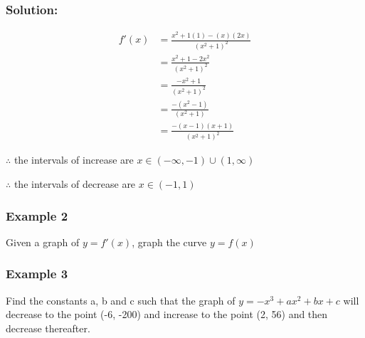 \documentclass{article}
\begin{document}
\subsubsection*{Solution:}
\begin{align*}
    f'(x)&=\frac{x^2+1(1)-(x)(2x)}{(x^2+1)^2}\\
    &=\frac{x^2+1-2x^2}{(x^2+1)^2}\\
    &=\frac{-x^2+1}{(x^2+1)^2}\\
    &=\frac{-(x^2-1)}{(x^2+1)}\\
    &=\frac{-(x-1)(x+1)}{(x^2+1)^2}
\end{align*}

$\therefore$ the intervals of increase are $x\in(-\infty,-1)\cup(1, \infty)$

$\therefore$ the intervals of decrease are $x\in (-1,1)$
\subsubsection{Example 2}
Given a graph of $y=f'(x)$, graph the curve $y=f(x)$

\begin{center}
\end{center}
\subsubsection{Example 3}
Find the constants a, b and c such that the graph of $y=-x^3+ax^2+bx+c$ will decrease to the point (-6, -200) and increase to the point (2, 56) and then decrease thereafter.
\end{document}
